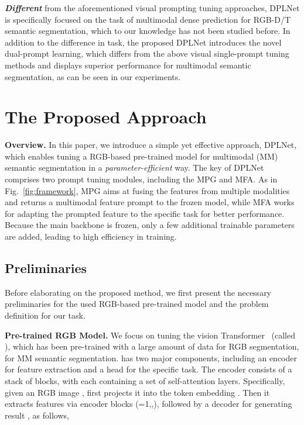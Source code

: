 \documentclass[10pt,twocolumn,letterpaper]{article}
\begin{document}
\textbf{\emph{Different}} from the aforementioned visual prompting tuning approaches, DPLNet is specifically focused on the task of multimodal dense prediction for RGB-D/T semantic segmentation, which to our knowledge has not been studied before. In addition to the difference in task, the proposed DPLNet introduces the novel dual-prompt learning, which differs from the above visual single-prompt tuning methods and displays superior performance for multimodal semantic segmentation, as can be seen in our experiments.


\section{The Proposed Approach}

\textbf{Overview.} In this paper, we introduce a simple yet effective approach, DPLNet, which enables tuning a RGB-based pre-trained model for multimodal (MM) semantic segmentation in a \emph{parameter-efficient} way. The key of DPLNet comprises two prompt tuning modules, including the MPG and MFA. As in Fig.~\ref{fig:framework}, MPG aims at fusing the features from multiple modalities and returns a multimodal feature prompt to the frozen model, while MFA works for adapting the prompted feature to the specific task for better performance. Because the main backbone is frozen, only a few additional trainable parameters are added, leading to high efficiency in training.


\subsection{Preliminaries}
\label{pre}

Before elaborating on the proposed method, we first present the necessary preliminaries for the used RGB-based pre-trained model and the problem definition for our task.

\textbf{Pre-trained RGB Model.} We focus on tuning the vision Transformer~\cite{segformer} (called ), which has been pre-trained with a large amount of data for RGB segmentation, for MM semantic segmentation.  has two major components, including an encoder for feature extraction and a head for the specific task. The encoder consists of a stack of blocks, with each containing a set of self-attention layers. Specifically, given an RGB image ,  first projects it into the token embedding . Then it extracts features via  encoder blocks  (=1,,), followed by a decoder  for generating result , as follows,
\end{document}
